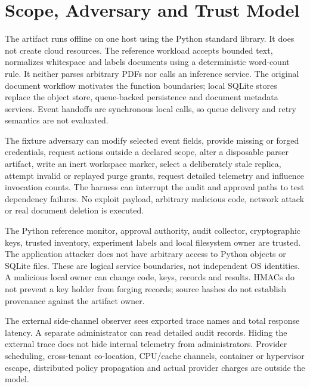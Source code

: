 \documentclass[11pt,a4paper]{article}
\begin{document}
\section{Scope, Adversary and Trust Model}\label{sec:threat}
The artifact runs offline on one host using the Python standard library. It does not create cloud resources. The reference workload accepts bounded text, normalizes whitespace and labels documents using a deterministic word-count rule. It neither parses arbitrary PDFs nor calls an inference service. The original document workflow motivates the function boundaries; local SQLite stores replace the object store, queue-backed persistence and document metadata services. Event handoffs are synchronous local calls, so queue delivery and retry semantics are not evaluated.

The fixture adversary can modify selected event fields, provide missing or forged credentials, request actions outside a declared scope, alter a disposable parser artifact, write an inert workspace marker, select a deliberately stale replica, attempt invalid or replayed purge grants, request detailed telemetry and influence invocation counts. The harness can interrupt the audit and approval paths to test dependency failures. No exploit payload, arbitrary malicious code, network attack or real document deletion is executed.

The Python reference monitor, approval authority, audit collector, cryptographic keys, trusted inventory, experiment labels and local filesystem owner are trusted. The application attacker does not have arbitrary access to Python objects or SQLite files. These are logical service boundaries, not independent OS identities. A malicious local owner can change code, keys, records and results. HMACs do not prevent a key holder from forging records; source hashes do not establish provenance against the artifact owner.

The external side-channel observer sees exported trace names and total response latency. A separate administrator can read detailed audit records. Hiding the external trace does not hide internal telemetry from administrators. Provider scheduling, cross-tenant co-location, CPU/cache channels, container or hypervisor escape, distributed policy propagation and actual provider charges are outside the model.
\end{document}
